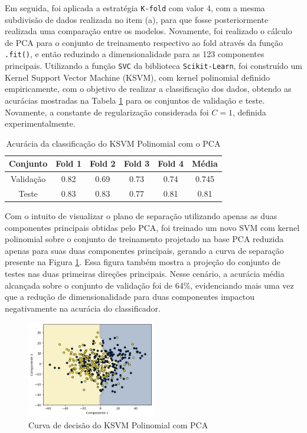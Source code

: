 \documentclass[]{abntex2}
\begin{document}
Em seguida, foi aplicada a estratégia \texttt{K-fold} com valor 4, com a mesma subdivisão de dados realizada no item (a), para que fosse posteriormente realizada uma comparação entre os modelos. Novamente, foi realizado o cálculo de PCA para o conjunto de treinamento respectivo ao fold através da função \texttt{.fit()}, e então reduzindo a dimensionalidade para as 123 componentes principais. Utilizando a função \texttt{SVC} da biblioteca \texttt{Scikit-Learn}, foi construído um Kernel Support Vector Machine (KSVM), com kernel polinomial definido empiricamente, com o objetivo de realizar a classificação dos dados, obtendo as acurácias mostradas na Tabela \ref{tab:pca_svm} para os conjuntos de validação e teste. Novamente, a constante de regularização considerada foi \(C=1\), definida experimentalmente.

\begin{table}[H]
    \centering
    \begin{tabular}{|c|c|c|c|c|c|}
    \hline
    \rowcolor[HTML]{C0C0C0} 
    Conjunto                          & Fold 1 & Fold 2 & Fold 3 & Fold 4 & Média  \\ \hline
    \cellcolor[HTML]{C0C0C0}Validação & 0.82   & 0.69   & 0.73   & 0.74   & 0.745  \\ \hline
    \cellcolor[HTML]{C0C0C0}Teste     & 0.83   & 0.83   & 0.77   & 0.81   & 0.81 \\ \hline
    \end{tabular}
    \caption{Acurácia da classificação do KSVM Polinomial com o PCA}
    \label{tab:pca_svm}
\end{table}

Com o intuito de visualizar o plano de separação utilizando apenas as duas componentes principais obtidas pelo PCA, foi treinado um novo SVM com kernel polinomial sobre o conjunto de treinamento projetado na base PCA reduzida apenas para suas duas componentes principais, gerando a curva de separação presente na Figura \ref{fig:pca_reta}. Essa figura também mostra a projeção do conjunto de testes nas duas primeiras direções principais. Nesse cenário, a acurácia média alcançada sobre o conjunto de validação foi de 64\%, evidenciando mais uma vez que a redução de dimensionalidade para duas componentes impactou negativamente na acurácia do classificador.

\begin{figure}[H]
    \centering 
    \includegraphics[width=0.5\textwidth]{imgs/ex1/pca_reta.png}
    \caption{Curva de decisão do KSVM Polinomial com PCA}
    \label{fig:pca_reta} %
\end{figure}
\end{document}
